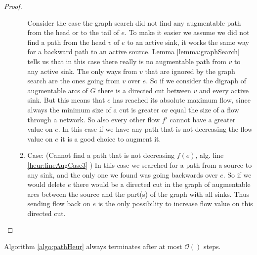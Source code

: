 \begin{proof}
\begin{itemize}
\begin{enumerate}
	  Consider the case the graph search did not find any augmentable path from the head or to the tail of $e$. 
	  To make it easier we assume we did not find a path from the head $v$ of $e$ to an active sink, it works the 
	  same way for a backward path to an active source.
	  Lemma \ref{lemma:graphSearch} tells us that in this case there really is no augmentable path from $v$ to any 
	  active sink. The only ways from $v$ that are ignored by the graph search are the ones going from $v$ over 
	  $e$. So if we consider the digraph of augmentable arcs of $G$ there is a directed cut between $v$ and every 
	  active sink. But this means that $e$ has reached its absolute maximum flow, since always the minimum size of
	  a cut is greater or equal the size of a flow through a network. 
	  So also every other flow $f'$ cannot have a greater value on $e$. In this case if we have any path that is 
	  not decreasing the flow value on $e$ it is a good choice to augment it. 
	  
       \item Case: (Cannot find a path that is not decreasing $f(e)$, alg. line \ref{heur:lineAugCase3} )
	  In this case we searched for a path from a source to any sink, and the only one we found was going backwards 
	  over $e$. So if we would delete $e$ there would be a directed cut in the graph of augmentable arcs between 
	  the source and the part(s) of the graph with all sinks. Thus sending flow back on $e$ is the only possibility 
	  to increase flow value on this directed cut.
      \end{enumerate}

  \end{itemize}


\end{proof}

\begin{prop}
 Algorithm \ref{algo:pathHeur} always terminates after at most $\mathcal{O}()$ steps.
\end{prop}
